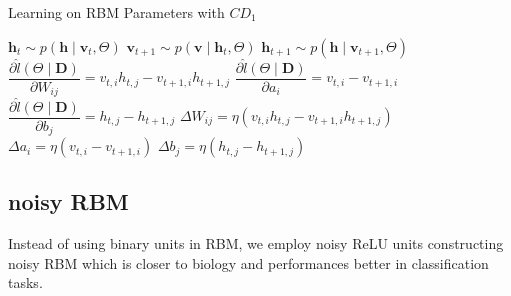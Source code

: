 \begin{algorithm}[h]
	\caption{Learning on RBM Parameters with $ CD_1 $}
	\label{alg:learn}
	\begin{algorithmic}
		 
		\State $ \mathbf{h}_t \sim p( \mathbf{h} \mid \mathbf{v}_t, \Theta) $
		\State $ \mathbf{v}_{t+1} \sim p( \mathbf{v} \mid \mathbf{h}_{t}, \Theta) $
		\State $ \mathbf{h}_{t+1} \sim p( \mathbf{h} \mid \mathbf{v}_{t+1}, \Theta) $
		\State $ \dfrac{\partial \hat{l} (\Theta \mid \mathbf{D})}{\partial W_{ij}} = v_{t,i} h_{t,j} - v_{t+1,i} h_{t+1,j}$
		\State $ \dfrac{\partial \hat{l} (\Theta \mid \mathbf{D})}{\partial a_{i}} = v_{t,i} - v_{t+1,i} $
		\State $  \dfrac{\partial \hat{l} (\Theta \mid \mathbf{D})}{\partial b_{j}} = h_{t,j} - h_{t+1,j}$
		\State $ \Delta W_{ij} = \eta ( v_{t,i} h_{t,j} - v_{t+1,i} h_{t+1,j}) $
		\State $ \Delta a_{i} = \eta ( v_{t,i} - v_{t+1,i}) $
		\State $ \Delta b_{j} = \eta ( h_{t,j} - h_{t+1,j}) $
		\EndFor
	\end{algorithmic}
\end{algorithm}
	

\subsection{noisy RBM}
Instead of using binary units in RBM, we employ noisy ReLU units constructing noisy RBM which is closer to biology and performances better in classification tasks\cite{nair2010rectified}.

